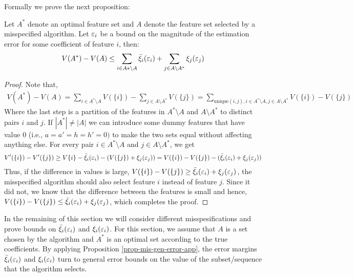 Formally we prove the next proposition:
\begin{proposition}\label{prop-mis-gen-error-app}
 Let $A^*$ denote an optimal feature set and $A$ denote the feature set selected by a misspecified algorithm.  Let $\varepsilon_i$ be a bound on the magnitude of the estimation error for some coefficient of feature $i$, then:
 \begin{align*}
     V(A^*)-V(A)  \leq  \sum_{i\in  A* \setminus A} \bar \xi_i(\varepsilon_i) +\sum_{j\in  A \setminus A^*} \xi_j(\varepsilon_j)
 \end{align*}
\end{proposition}
\begin{proof}
Note that, 
\begin{align*}
    V(A^*)-V(A) = \sum_{i\in A^* \setminus A} V(\{i\}) - \sum_{j\in A \setminus A^*} V(\{j\}) = 
   {\sum_{\text{unique} (i,j), i\in  A^* \setminus A, j\in  A \setminus A^*}}
    V(\{i\}) - V(\{j\})
\end{align*}
Where the last step is a partition of the features in $A^* \setminus A$ and $A \setminus A^*$ to distinct pairs $i$ and $j$. If $|A^*|\neq|A|$ we can introduce some dummy features that have value $0$ (i.e., $a=a'=h=h'=0)$ to make the two sets equal without affecting anything else. For every pair $i \in A^* \setminus A$ and $ j \in A \setminus A^*$, we get
\begin{align*}
    V'(\{i\})-V'(\{j\}) \geq V\{i\} - \bar \xi_i(\varepsilon_i) - (V(\{j\}) + \xi_j(\varepsilon_j) ) = V(\{i\}) - V(\{j\}) - (\bar \xi_i(\varepsilon_i) + \xi_j(\varepsilon_j)) 
\end{align*}
Thus, if the difference in values is large, $V(\{i\}) - V(\{j\}) \geq \bar \xi_i(\varepsilon_i) + \xi_j(\varepsilon_j)$, the misspecified algorithm should also select feature $i$ instead of feature $j$. Since it did not, we know that the difference between the features is small and hence, $V(\{i\}) - V(\{j\}) \leq \bar \xi_i(\varepsilon_i) + \xi_j(\varepsilon_j)$, which completes the proof.
\end{proof}

In the remaining of this section we will consider different misspesifications and prove bounds on $\bar \xi_i(\varepsilon_i)$ and $\xi_i(\varepsilon_i)$. {For this section, we assume that $A$ is a set chosen by the algorithm and $A^*$ is an optimal set according to the true coefficients.}
By applying Proposition \ref{prop-mis-gen-error-app}, the error margins $\bar \xi_i(\varepsilon_i)$ and $\xi_i(\varepsilon_i)$ turn to general error bounds on the value of the subset/sequence that the algorithm selects. 



